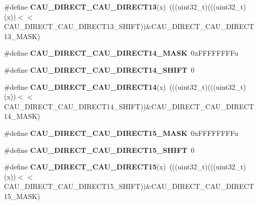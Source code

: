 \begin{DoxyCompactItemize}
\item 
\#define {\bfseries C\+A\+U\+\_\+\+D\+I\+R\+E\+C\+T\+\_\+\+C\+A\+U\+\_\+\+D\+I\+R\+E\+C\+T13}(x)~(((uint32\+\_\+t)(((uint32\+\_\+t)(x))$<$$<$C\+A\+U\+\_\+\+D\+I\+R\+E\+C\+T\+\_\+\+C\+A\+U\+\_\+\+D\+I\+R\+E\+C\+T13\+\_\+\+S\+H\+I\+FT))\&C\+A\+U\+\_\+\+D\+I\+R\+E\+C\+T\+\_\+\+C\+A\+U\+\_\+\+D\+I\+R\+E\+C\+T13\+\_\+\+M\+A\+SK)\hypertarget{group__CAU__Register__Masks_ga4ad6c63ec619cc20c8d34c230907cb72}{}\label{group__CAU__Register__Masks_ga4ad6c63ec619cc20c8d34c230907cb72}

\item 
\#define {\bfseries C\+A\+U\+\_\+\+D\+I\+R\+E\+C\+T\+\_\+\+C\+A\+U\+\_\+\+D\+I\+R\+E\+C\+T14\+\_\+\+M\+A\+SK}~0x\+F\+F\+F\+F\+F\+F\+F\+Fu\hypertarget{group__CAU__Register__Masks_ga8145212bbedada0193bfa6042ea637a6}{}\label{group__CAU__Register__Masks_ga8145212bbedada0193bfa6042ea637a6}

\item 
\#define {\bfseries C\+A\+U\+\_\+\+D\+I\+R\+E\+C\+T\+\_\+\+C\+A\+U\+\_\+\+D\+I\+R\+E\+C\+T14\+\_\+\+S\+H\+I\+FT}~0\hypertarget{group__CAU__Register__Masks_ga017a8a273655c5f491aa2b348b1ed9bc}{}\label{group__CAU__Register__Masks_ga017a8a273655c5f491aa2b348b1ed9bc}

\item 
\#define {\bfseries C\+A\+U\+\_\+\+D\+I\+R\+E\+C\+T\+\_\+\+C\+A\+U\+\_\+\+D\+I\+R\+E\+C\+T14}(x)~(((uint32\+\_\+t)(((uint32\+\_\+t)(x))$<$$<$C\+A\+U\+\_\+\+D\+I\+R\+E\+C\+T\+\_\+\+C\+A\+U\+\_\+\+D\+I\+R\+E\+C\+T14\+\_\+\+S\+H\+I\+FT))\&C\+A\+U\+\_\+\+D\+I\+R\+E\+C\+T\+\_\+\+C\+A\+U\+\_\+\+D\+I\+R\+E\+C\+T14\+\_\+\+M\+A\+SK)\hypertarget{group__CAU__Register__Masks_ga76ec783a1eb1195dc4e7bb7bd9ca654e}{}\label{group__CAU__Register__Masks_ga76ec783a1eb1195dc4e7bb7bd9ca654e}

\item 
\#define {\bfseries C\+A\+U\+\_\+\+D\+I\+R\+E\+C\+T\+\_\+\+C\+A\+U\+\_\+\+D\+I\+R\+E\+C\+T15\+\_\+\+M\+A\+SK}~0x\+F\+F\+F\+F\+F\+F\+F\+Fu\hypertarget{group__CAU__Register__Masks_gabd722971e5e62de19fda379b987cf321}{}\label{group__CAU__Register__Masks_gabd722971e5e62de19fda379b987cf321}

\item 
\#define {\bfseries C\+A\+U\+\_\+\+D\+I\+R\+E\+C\+T\+\_\+\+C\+A\+U\+\_\+\+D\+I\+R\+E\+C\+T15\+\_\+\+S\+H\+I\+FT}~0\hypertarget{group__CAU__Register__Masks_ga33f80687a392b95e7b5a8d15530cc2cf}{}\label{group__CAU__Register__Masks_ga33f80687a392b95e7b5a8d15530cc2cf}

\item 
\#define {\bfseries C\+A\+U\+\_\+\+D\+I\+R\+E\+C\+T\+\_\+\+C\+A\+U\+\_\+\+D\+I\+R\+E\+C\+T15}(x)~(((uint32\+\_\+t)(((uint32\+\_\+t)(x))$<$$<$C\+A\+U\+\_\+\+D\+I\+R\+E\+C\+T\+\_\+\+C\+A\+U\+\_\+\+D\+I\+R\+E\+C\+T15\+\_\+\+S\+H\+I\+FT))\&C\+A\+U\+\_\+\+D\+I\+R\+E\+C\+T\+\_\+\+C\+A\+U\+\_\+\+D\+I\+R\+E\+C\+T15\+\_\+\+M\+A\+SK)\hypertarget{group__CAU__Register__Masks_gaa12d64f2daab5410099ff5be09345b3d}{}\label{group__CAU__Register__Masks_gaa12d64f2daab5410099ff5be09345b3d}


\end{DoxyCompactItemize}
